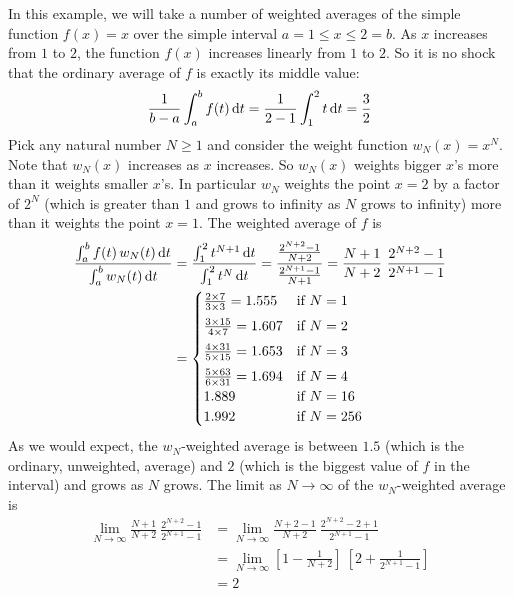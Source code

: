 \begin{eg}\label{eg:weightedAverage}
In this example, we will take a number of weighted averages of the simple function 
$f(x)=x$ over the simple interval $a=1\le x\le 2=b$. As $x$ increases from $1$ to $2$,
the function $f(x)$ increases linearly from $1$ to $2$. So it is no shock that the 
ordinary average of $f$ is exactly its middle value:
\begin{equation*}
\frac{1}{b-a}\int_a^b f(t)\,\mathrm{d}t
=\frac{1}{2-1}\int_1^2 t\,\mathrm{d}t
=\frac{3}{2}
\end{equation*}  
Pick any natural number $N\ge 1$ and consider the weight function $w_N(x)=x^N$. Note that
$w_N(x)$ increases as $x$ increases. So $w_N(x)$ weights bigger $x$'s more than it weights 
smaller $x$'s. In particular $w_N$ weights the point $x=2$ by a factor of $2^N$
(which is greater than $1$ and grows to infinity as $N$ grows to infinity) more than it weights the point $x=1$. The weighted average of $f$ is
\begin{align*}
\frac{\int_a^b f(t)\,w_N(t)\,\mathrm{d}t}{\int_a^b w_N(t)\,\mathrm{d}t}
&=\frac{\int_1^2 t^{N+1}\,\mathrm{d}t}{\int_1^2 t^N\,\mathrm{d}t}
=\frac{\frac{2^{N+2}-1}{N+2}}{\frac{2^{N+1}-1}{N+1}}
=\frac{N+1}{N+2}\ \frac{2^{N+2}-1}{2^{N+1}-1} \\
&=\begin{cases}
   \frac{2\times 7}{3\times 3}  = 1.555  &\text{if }N=1 \\[0.05in]
   \frac{3\times 15}{4\times 7} = 1.607  &\text{if }N=2 \\[0.05in]
   \frac{4\times 31}{5\times 15}= 1.653  &\text{if }N=3 \\[0.05in]
   \frac{5\times 63}{6\times 31}= 1.694  &\text{if }N=4 
   \\ 1.889  &\text{if }N=16  
   \\ 1.992  &\text{if }N=256  
   \end{cases}
\end{align*}
As we would expect, the $w_N$-weighted average is between $1.5$ (which is the ordinary, unweighted, average) and $2$ (which is the biggest value of $f$ in the interval) and 
grows as $N$ grows. The limit as $N\rightarrow\infty$ of the $w_N$-weighted average is
\begin{align*}
\lim_{N\rightarrow\infty}\frac{N+1}{N+2}\ \frac{2^{N+2}-1}{2^{N+1}-1} 
&=\lim_{N\rightarrow\infty}\frac{N+2-1}{N+2}\ \frac{2^{N+2}-2+1}{2^{N+1}-1} \\
&=\lim_{N\rightarrow\infty}\left[1-\frac{1}{N+2}\right]\ 
                           \left[2+\frac{1}{2^{N+1}-1}\right] \\
&=2
\end{align*} 

\end{eg}

